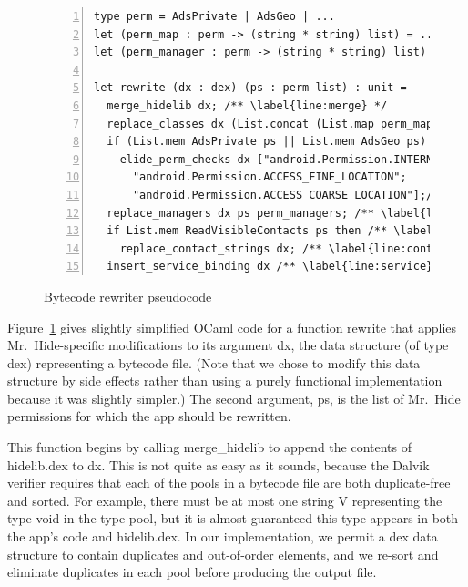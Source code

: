\documentclass[preprint]{sig-alternate-10pt}
\newcommand{\code}[1]{\textsf{#1}}
\newcommand{\lib}{Mr.\ Hide\xspace}
\begin{document}
\begin{figure}[t]
\begin{lstlisting}[numbers=left, frame=single, xrightmargin=-2pt]
type perm = AdsPrivate | AdsGeo | ...
let (perm_map : perm -> (string * string) list) = ... /** \label{line:perm-map} */
let (perm_manager : perm -> (string * string) list) = ... /** \label{line:perm-manage} */

let rewrite (dx : dex) (ps : perm list) : unit =
  merge_hidelib dx; /** \label{line:merge} */
  replace_classes dx (List.concat (List.map perm_map ps)) /** \label{line:class_repl} */
  if (List.mem AdsPrivate ps || List.mem AdsGeo ps) then /** \label{line:elide-begin} */
    elide_perm_checks dx ["android.Permission.INTERNET"; 
      "android.Permission.ACCESS_FINE_LOCATION";
      "android.Permission.ACCESS_COARSE_LOCATION"];/** \label{line:elide-end} */
  replace_managers dx ps perm_managers; /** \label{line:manager-replace} */
  if List.mem ReadVisibleContacts ps then /** \label{line:contact-begin} */
    replace_contact_strings dx; /** \label{line:contact-end} */
  insert_service_binding dx /** \label{line:service} */
\end{lstlisting}
\caption{Bytecode rewriter pseudocode}
\label{fig:redexer-func}
\end{figure}


Figure~\ref{fig:redexer-func} gives slightly simplified OCaml code for
a function \code{rewrite} that applies \lib-specific modifications
to its argument \code{dx}, the data structure (of type \code{dex})
representing a bytecode file. (Note that we chose to modify this data
structure by side effects rather than using a purely functional
implementation because it was slightly simpler.) The second argument,
\code{ps}, is the list of \lib permissions for which the app should be rewritten.

This function begins by calling \code{merge\_hidelib} to append the
contents of \code{hidelib.dex} to \code{dx}. This is not quite as easy
as it sounds, because the Dalvik verifier requires that each
of the pools in a bytecode file are both duplicate-free and
sorted. For example, there must be at most one string \code{V}
representing the type void in the type pool, but it is almost
guaranteed this type appears in both the app's code and
\code{hidelib.dex}. In our implementation, we permit a \code{dex} data
structure to contain duplicates and out-of-order elements, and we
re-sort and eliminate duplicates in each pool before producing the
output file.
\end{document}
